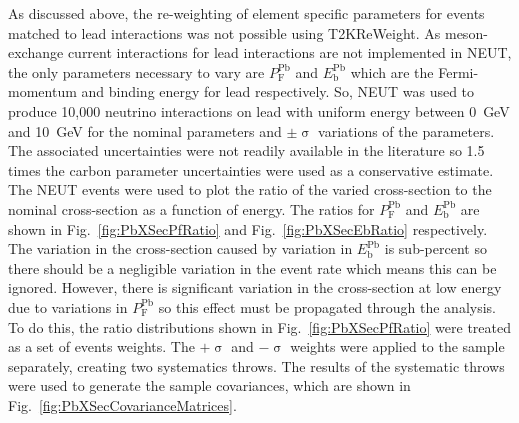 As discussed above, the re-weighting of element specific parameters for events matched to lead interactions was not possible using T2KReWeight.  As meson-exchange current interactions for lead interactions are not implemented in NEUT, the only parameters necessary to vary are $P_{\textrm{F}}^{\textrm{Pb}}$ and $E_{\textrm{b}}^{\textrm{Pb}}$ which are the Fermi-momentum and binding energy for lead respectively.  So, NEUT was used to produce 10,000 neutrino interactions on lead with uniform energy between 0~GeV and 10~GeV for the nominal parameters and $\pm\upsigma$ variations of the parameters.  The associated uncertainties were not readily available in the literature so 1.5 times the carbon parameter uncertainties were used as a conservative estimate.  The NEUT events were used to plot the ratio of the varied cross-section to the nominal cross-section as a function of energy.  The ratios for $P_{\textrm{F}}^{\textrm{Pb}}$ and $E_{\textrm{b}}^{\textrm{Pb}}$ are shown in Fig.~\ref{fig:PbXSecPfRatio} and Fig.~\ref{fig:PbXSecEbRatio} respectively.  The variation in the cross-section caused by variation in $E_{\textrm{b}}^{\textrm{Pb}}$ is sub-percent so there should be a negligible variation in the event rate which means this can be ignored.  However, there is significant variation in the cross-section at low energy due to variations in $P_{\textrm{F}}^{\textrm{Pb}}$ so this effect must be propagated through the analysis.  To do this, the ratio distributions shown in Fig.~\ref{fig:PbXSecPfRatio} were treated as a set of events weights.  The $+\upsigma$ and $-\upsigma$ weights were applied to the sample separately, creating two systematics throws.  The results of the systematic throws were used to generate the sample covariances, which are shown in Fig.~\ref{fig:PbXSecCovarianceMatrices}.
